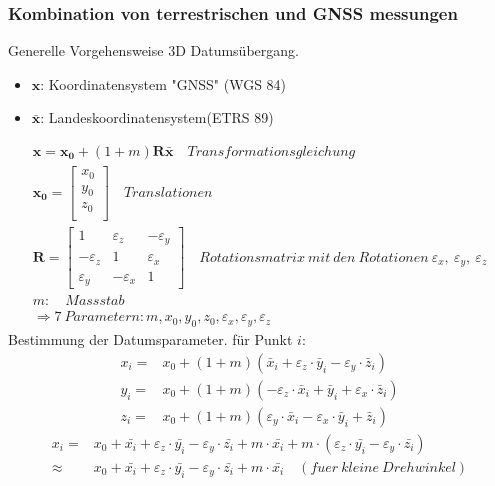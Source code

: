 \documentclass[12pt]{article}
\begin{document}
\subsubsection{Kombination von terrestrischen und GNSS messungen}
Generelle Vorgehensweise 3D Datumsübergang.
\begin{itemize}
\item $\bm{{x}}$: Koordinatensystem "GNSS" (WGS 84)
\item $\bar{{{\bm{x}}}}$: Landeskoordinatensystem(ETRS 89)
\end{itemize}
\begin{gather*}
\bm{x} = \bm{x_0} + (1 + m) \bm{R} \bar{\bm{x}} \quad Transformationsgleichung\\
\bm{x_0} = \begin{bmatrix}
x_0 \\
y_0\\
z_0\\
\end{bmatrix} \quad Translationen \\
\bm{R} = \begin{bmatrix}
1 & \varepsilon_z & -\varepsilon_y \\
-\varepsilon_z & 1 &  \varepsilon_x \\
\varepsilon_y & - \varepsilon_x & 1
\end{bmatrix} \quad Rotationsmatrix\ mit \ den\ Rotationen\ \varepsilon_x,\ \varepsilon_y,\ \varepsilon_z \\
m:\quad Massstab \\
\Longrightarrow 7 \ Parametern: m,x_0,y_0,z_0,\varepsilon_x,\varepsilon_y,\varepsilon_z
\end{gather*}
Bestimmung der Datumsparameter. \newline
für Punkt $i$:
\begin{align*}
x_i = & x_0 + (1 + m)(\bar{x}_i + \varepsilon_z \cdot \bar{y}_i - \varepsilon_y \cdot \bar{z}_i)\\
y_i = & x_0 + (1 + m)(-\varepsilon_z \cdot \bar{x}_i + \bar{y}_i + \varepsilon_x \cdot \bar{z}_i) \\
z_i = & x_0 + (1 + m)(\varepsilon_y \cdot \bar{x}_i - \varepsilon_x \cdot \bar{y}_i + \bar{z}_i)
\end{align*} 
\begin{align*}
{x_i} = & {x}_0 + \bar{{x}_i} + \varepsilon_z \cdot \bar{{y}_i} - \varepsilon_y \cdot \bar{{z}_i} + m \cdot \bar{{x}_i} + m \cdot  (\varepsilon_z \cdot \bar{{y}_i} - \varepsilon_y \cdot \bar{{z}_i}) \\
\approx & {x}_0 + \bar{{x}_i} + \varepsilon_z \cdot \bar{{y}_i} - \varepsilon_y \cdot \bar{{z}_i} + m \cdot \bar{{x}_i} \quad (fuer\  kleine\  Drehwinkel)
\end{align*}
\end{document}
